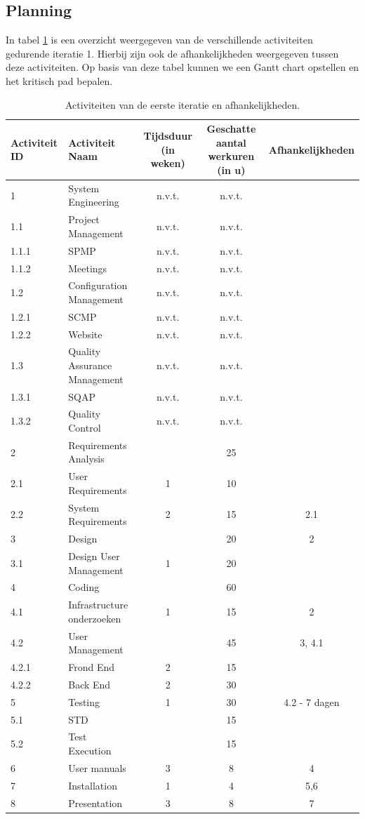 \subsection{Planning}
In tabel \ref{tab:ActivityDependenciesIteratie1} is een overzicht weergegeven van de verschillende activiteiten gedurende iteratie 1. Hierbij zijn ook de afhankelijkheden weergegeven tussen deze activiteiten. Op basis van deze tabel kunnen we een Gantt chart opstellen en het kritisch pad bepalen.
\begin{table} [H]
	\centering
	\caption{Activiteiten van de eerste iteratie en afhankelijkheden.}
	\begin{tabular} {l|l|c|c|c}
		Activiteit ID & Activiteit Naam & Tijdsduur (in weken) & Geschatte aantal werkuren (in u) & Afhankelijkheden \\
		\hline
		1 	& System Engineering 		& n.v.t. & n.v.t. & \\
		1.1 & Project Management 		& n.v.t. & n.v.t. & \\
		1.1.1 & SPMP					& n.v.t. & n.v.t. & \\
		1.1.2 & Meetings				& n.v.t. & n.v.t. & \\
		1.2	& Configuration Management	& n.v.t. & n.v.t. & \\
		1.2.1 & SCMP  					& n.v.t. & n.v.t. & \\
		1.2.2 & Website					& n.v.t. & n.v.t. & \\
		1.3	& Quality Assurance Management & n.v.t. & n.v.t. & \\
		1.3.1 & SQAP					& n.v.t. & n.v.t. & \\
		1.3.2 & Quality Control			& n.v.t. & n.v.t. & \\
		\hline
		2 	& Requirements Analysis 	&   & 25 &  \\
		2.1 & User Requirements 		& 1 & 10 & \\
		2.2 & System Requirements 		& 2 & 15 & 2.1 \\
		\hline
		3 	& Design 					&   & 20 & 2 \\
		3.1 & Design User Management 	& 1 & 20 & \\
		\hline
		4 	& Coding 					&   & 60 & \\
		4.1 & Infrastructure onderzoeken & 1 & 15 & 2\\
		4.2 & User Management			&   & 45 & 3, 4.1  \\
		4.2.1 & Frond End 		 		& 2 & 15 & \\
		4.2.2 & Back End				& 2 & 30 & \\
		\hline
		5 	& Testing 					& 1 & 30 & 4.2 - 7 dagen \\
		5.1 & STD						&   & 15 & \\
		5.2 & Test Execution			&   & 15 & \\
		\hline
		6 	& User manuals 				& 3 & 8 & 4 \\
		\hline
		7 	& Installation 				& 1 & 4 & 5,6 \\
		\hline
		8 	& Presentation 				& 3 & 8 & 7	\\
	\end{tabular}
	\label{tab:ActivityDependenciesIteratie1}
\end{table}

